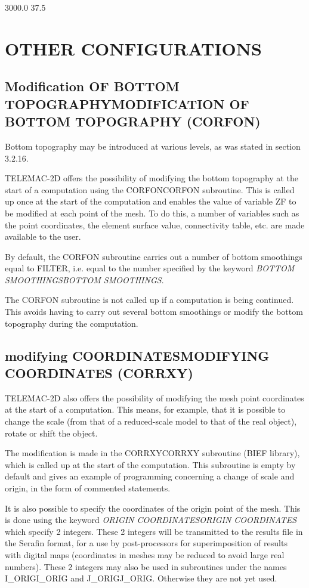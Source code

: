 \documentclass{article} %
\begin{document}
 3000.0 37.5


\section{  OTHER CONFIGURATIONS}


\subsection{ Modification OF BOTTOM TOPOGRAPHYMODIFICATION OF BOTTOM TOPOGRAPHY (CORFON)}

 Bottom topography may be introduced at various levels, as was stated in section 3.2.16.

 TELEMAC-2D offers the possibility of modifying the bottom topography at the start of a computation using the CORFONCORFON subroutine. This is called up once at the start of the computation and enables the value of variable ZF to be modified at each point of the mesh. To do this, a number of variables such as the point coordinates, the element surface value, connectivity table, etc. are made available to the user.

 By default, the CORFON subroutine carries out a number of bottom smoothings equal to FILTER, i.e. equal to the number specified by the keyword \textit{BOTTOM SMOOTHINGSBOTTOM SMOOTHINGS}.

 The CORFON subroutine is not called up if a computation is being continued. This avoids having to carry out several bottom smoothings or modify the bottom topography during the computation.


\subsection{ modifying COORDINATESMODIFYING COORDINATES (CORRXY)}

 TELEMAC-2D also offers the possibility of modifying the mesh point coordinates at the start of a computation. This means, for example, that it is possible to change the scale (from that of a reduced-scale model to that of the real object), rotate or shift the object.

 The modification is made in the CORRXYCORRXY subroutine (BIEF library), which is called up at the start of the computation. This subroutine is empty by default and gives an example of programming concerning a change of scale and origin, in the form of commented statements.

 It is also possible to specify the coordinates of the origin point of the mesh. This is done using the keyword \textit{ORIGIN COORDINATESORIGIN COORDINATES} which specify 2 integers. These 2 integers will be transmitted to the results file in the Serafin format, for a use by post-processors for superimposition of results with digital maps (coordinates in meshes may be reduced to avoid large real numbers). These 2 integers may also be used in subroutines under the names I\_ORIGI\_ORIG and J\_ORIGJ\_ORIG. Otherwise they are not yet used.
\end{document}
